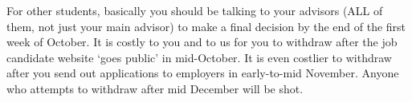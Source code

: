 \documentclass{econtex}
\begin{document}
\begin{enumerate}
For other students, basically you should be talking to your advisors (ALL of them, not just your main advisor) to make a final decision by the end of the first week of October.  It is costly to you and to us for you to withdraw after the job candidate website `goes public' in mid-October.  It is even costlier to withdraw after you send out applications to employers in early-to-mid November.  Anyone who attempts to withdraw after mid December will be shot.

\begin{comment}

  In the dept meeting on 2006-10-17 a question was raised about
  whether we are really serious about our policy, as stated by Larry,
  that ``there is no such thing as a 7th year student.''  

  The answer is yes.

  There was then some discussion about the relationship between going
  on the job market and remaining in the program, caused by the fact
  that there are currently three students (Tereanu, Svitil, Lu) who
  are clearly not ready for the job market but have not given up all
  hope of finishing a dissertation by August of next year.

  The resolution (subsequently clarified in emails on 2006-10-18 and
  2006-10-19 and an email to Zhou Lu on 2006-10-19 from CDC) was as
  follows.

  Our declared public policy (see the graduate \href{handbook}{http://www.econ2.jhu.edu/pdf/Econ_Grad_Handbook.pdf}) is that nobody can enroll for a 7th year
  in the program.  In practice, if in the opinion of an advisor and
  second advisor, a student's dissertation is essentially complete as
  of August of the 6th year, we may relax this rigor slightly in order
  to arrange a defense and final ``cleaning up'' of details - but {\it
    only} in the case where the dissertation is in all essentials
  complete.

  So, an important real and psychological point here is that failure
  to be included in the official list of candidates is almost (but not
  quite) equivalent to the end of all hope of obtaining a JHU PhD.  If
  a student uses wisely the time freed up by not participating in the
  job market to conduct an intense burst of high quality research, it
  is in principle quite possible that they will finish a dissertation
  despite their prior lack of progress.  The exclusion from the job
  market process may concentrate their minds in a way that has not
  happened before.


\end{comment}
\end{enumerate}
\end{document}
